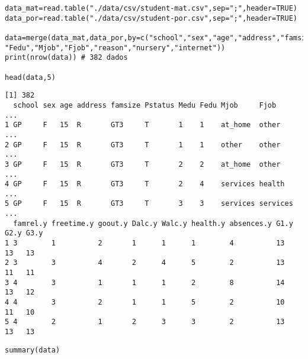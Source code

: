 \documentclass[12pt]{abntex2}
\begin{document}
\begin{verbatim}
data_mat=read.table("./data/csv/student-mat.csv",sep=";",header=TRUE)
data_por=read.table("./data/csv/student-por.csv",sep=";",header=TRUE)

data=merge(data_mat,data_por,by=c("school","sex","age","address","famsize","Pstatus","Medu",
"Fedu","Mjob","Fjob","reason","nursery","internet"))
print(nrow(data)) # 382 dados

head(data,5)
\end{verbatim}

\begin{verbatim}
[1] 382
  school sex age address famsize Pstatus Medu Fedu Mjob     Fjob     ...
1 GP     F   15  R       GT3     T       1    1    at_home  other    ...
2 GP     F   15  R       GT3     T       1    1    other    other    ...
3 GP     F   15  R       GT3     T       2    2    at_home  other    ...
4 GP     F   15  R       GT3     T       2    4    services health   ...
5 GP     F   15  R       GT3     T       3    3    services services ...
  famrel.y freetime.y goout.y Dalc.y Walc.y health.y absences.y G1.y G2.y G3.y
1 3        1          2       1      1      1        4          13   13   13  
2 3        3          4       2      4      5        2          13   11   11  
3 4        3          1       1      1      2        8          14   13   12  
4 4        3          2       1      1      5        2          10   11   10  
5 4        2          1       2      3      3        2          13   13   13  
\end{verbatim}

\begin{verbatim}
summary(data)
\end{verbatim}
\end{document}
